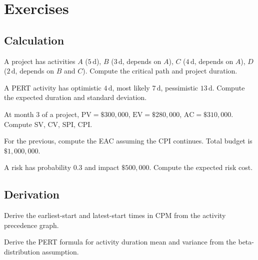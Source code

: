 \section{Exercises}

\subsection*{Calculation}

\begin{exercise}
A project has activities $A$ ($5\,\text{d}$), $B$ ($3\,\text{d}$, depends on $A$), $C$ ($4\,\text{d}$, depends on $A$), $D$ ($2\,\text{d}$, depends on $B$ and $C$). Compute the critical path and project duration.
\end{exercise}

\begin{exercise}
A PERT activity has optimistic $4\,\text{d}$, most likely $7\,\text{d}$, pessimistic $13\,\text{d}$. Compute the expected duration and standard deviation.
\end{exercise}

\begin{exercise}
At month $3$ of a project, $\text{PV} = \$300{,}000$, $\text{EV} = \$280{,}000$, $\text{AC} = \$310{,}000$. Compute SV, CV, SPI, CPI.
\end{exercise}

\begin{exercise}
For the previous, compute the EAC assuming the CPI continues. Total budget is $\$1{,}000{,}000$.
\end{exercise}

\begin{exercise}
A risk has probability $0.3$ and impact $\$500{,}000$. Compute the expected risk cost.
\end{exercise}

\subsection*{Derivation}

\begin{exercise}
Derive the earliest-start and latest-start times in CPM from the activity precedence graph.
\end{exercise}

\begin{exercise}
Derive the PERT formula for activity duration mean and variance from the beta-distribution assumption.
\end{exercise}

